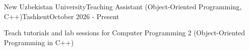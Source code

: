 \begin{resume_employer}{New Uzbekistan University}{Teaching Assistant (Object-Oriented Programming, C++)}{Tashkent}{October 2026 - Present}
\item Teach tutorials and lab sessions for Computer Programming 2 (Object-Oriented Programming in C++)
\end{resume_employer}

